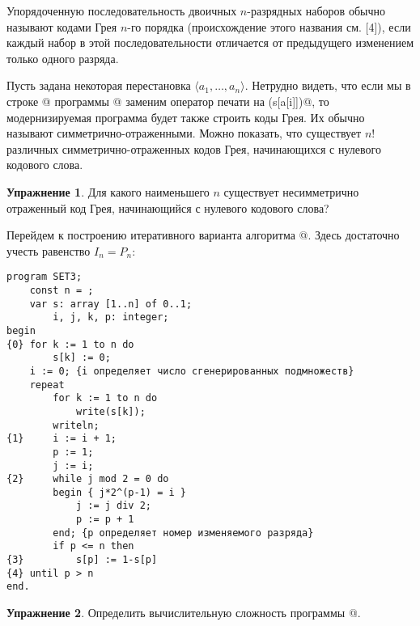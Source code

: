 \documentclass[12pt,a4paper]{article}
\theoremstyle{plain}
\theoremstyle{definition}
\newtheorem*{task}{Упражнение}
\theoremstyle{remark}
\newtheorem*{comment}{Комментарий}
\begin{document}
Упорядоченную последовательность двоичных $n$-разрядных наборов обычно называют кодами Грея $n$-го порядка (происхождение этого названия см. [4]), если каждый набор в этой последовательности отличается от предыдущего изменением только одного разряда.

Пусть задана некоторая перестановка $\langle a_1,\ldots,a_n\rangle$. Нетрудно видеть, что если мы в строке @ программы @ заменим оператор печати на \verb@write(s[a[i]])@, то модернизируемая программа будет также строить коды Грея. Их обычно называют симметрично-отраженными. Можно показать, что существует $n!$ различных симметрично-отраженных кодов Грея, начинающихся с нулевого кодового слова.

\begin{task}
Для какого наименьшего $n$ существует несимметрично отраженный код Грея, начинающийся с нулевого кодового слова?
\end{task}

Перейдем к построению итеративного варианта алгоритма @. Здесь достаточно учесть равенство $I_n = P_n$:

\begin{verbatim}
program SET3;
    const n = ;
    var s: array [1..n] of 0..1;
        i, j, k, p: integer;
begin
{0} for k := 1 to n do
        s[k] := 0;
    i := 0; {i определяет число сгенерированных подмножеств}
    repeat
        for k := 1 to n do
            write(s[k]);
        writeln;
{1}     i := i + 1;
        p := 1;
        j := i;
{2}     while j mod 2 = 0 do
        begin { j*2^(p-1) = i }
            j := j div 2;
            p := p + 1
        end; {p определяет номер изменяемого разряда}
        if p <= n then
{3}         s[p] := 1-s[p]
{4} until p > n
end.
\end{verbatim}

\begin{comment}
Пусть после выполнения оператора \verb@{1}@ $i$ имеет двоичное разложение \\$b_m\ldots b_p0\ldots 0$, где $b_p=1$ (или до выполнения оператора \verb@{1}@ значение $i$ в двоичной системе выглядело как $b_m\ldots b_{p+1}01\ldots1$ (сравните с программой \verb@SET1@)). Для определения $p$ достаточно выполнить оператор \verb@{2}@. Условие \verb@{4}@ означает, что уже сгенерировано $2^n$ кодовых слов.
\end{comment}

\begin{task}
Определить вычислительную сложность программы @.
\end{task}
\end{document}
